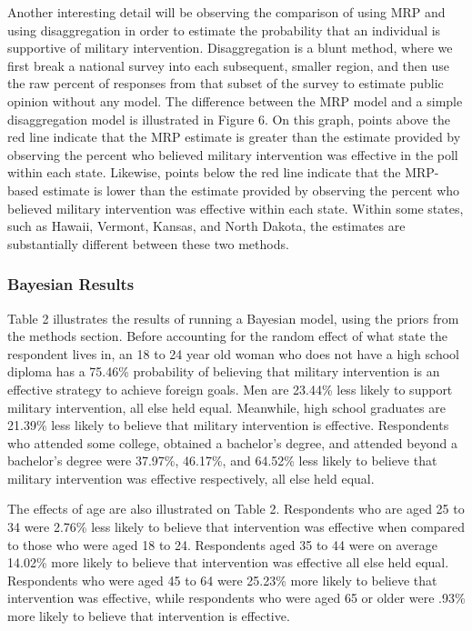 \documentclass[
  11pt,
]{article}
\begin{document}
Another interesting detail will be observing the comparison of using MRP
and using disaggregation in order to estimate the probability that an
individual is supportive of military intervention. Disaggregation is a
blunt method, where we first break a national survey into each
subsequent, smaller region, and then use the raw percent of responses
from that subset of the survey to estimate public opinion without any
model. The difference between the MRP model and a simple disaggregation
model is illustrated in Figure 6. On this graph, points above the red
line indicate that the MRP estimate is greater than the estimate
provided by observing the percent who believed military intervention was
effective in the poll within each state. Likewise, points below the red
line indicate that the MRP-based estimate is lower than the estimate
provided by observing the percent who believed military intervention was
effective within each state. Within some states, such as Hawaii,
Vermont, Kansas, and North Dakota, the estimates are substantially
different between these two methods.

\hypertarget{bayesian-results}{%
\subsubsection{Bayesian Results}\label{bayesian-results}}

Table 2 illustrates the results of running a Bayesian model, using the
priors from the methods section. Before accounting for the random effect
of what state the respondent lives in, an 18 to 24 year old woman who
does not have a high school diploma has a 75.46\% probability of
believing that military intervention is an effective strategy to achieve
foreign goals. Men are 23.44\% less likely to support military
intervention, all else held equal. Meanwhile, high school graduates are
21.39\% less likely to believe that military intervention is effective.
Respondents who attended some college, obtained a bachelor's degree, and
attended beyond a bachelor's degree were 37.97\%, 46.17\%, and 64.52\%
less likely to believe that military intervention was effective
respectively, all else held equal.

The effects of age are also illustrated on Table 2. Respondents who are
aged 25 to 34 were 2.76\% less likely to believe that intervention was
effective when compared to those who were aged 18 to 24. Respondents
aged 35 to 44 were on average 14.02\% more likely to believe that
intervention was effective all else held equal. Respondents who were
aged 45 to 64 were 25.23\% more likely to believe that intervention was
effective, while respondents who were aged 65 or older were .93\% more
likely to believe that intervention is effective.
\end{document}
